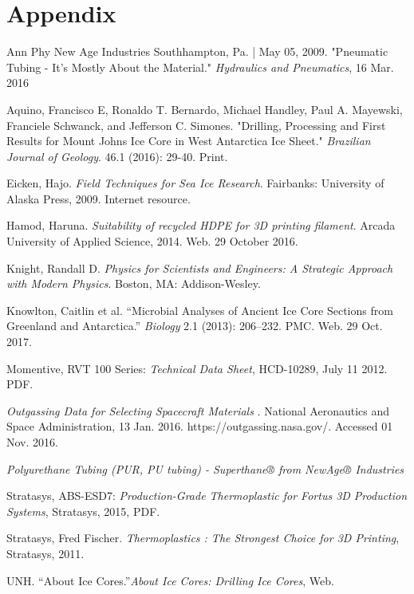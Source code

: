 \documentclass{article}
\begin{document}
\section{Appendix}
\begin{thebibliography}{12}
Ann Phy New Age Industries Southhampton, Pa. | May 05, 2009. "Pneumatic Tubing - It's Mostly About the Material." \textit{Hydraulics and Pneumatics}, 16 Mar. 2016

Aquino, Francisco E, Ronaldo T. Bernardo, Michael Handley, Paul A. Mayewski, Franciele Schwanck, and Jefferson C. Simones. "Drilling, Processing and First Results for Mount Johns Ice Core in West Antarctica Ice Sheet." \textit{Brazilian Journal of Geology}. 46.1 (2016): 29-40. Print.

Eicken, Hajo. \textit{Field Techniques for Sea Ice Research}. Fairbanks: University of Alaska Press, 2009. Internet resource.

Hamod, Haruna. \textit{Suitability of recycled HDPE for 3D printing filament}. Arcada University of Applied Science, 2014. Web. 29 October 2016.

Knight, Randall D. \textit{Physics for Scientists and Engineers: A Strategic Approach with Modern Physics}. Boston, MA: Addison-Wesley.

Knowlton, Caitlin et al. “Microbial Analyses of Ancient Ice Core Sections from Greenland and Antarctica.” \textit{Biology} 2.1 (2013): 206–232. PMC. Web. 29 Oct. 2017.

Momentive, RVT 100 Series: \textit{Technical Data Sheet}, HCD-10289, July 11 2012. PDF.

\textit{Outgassing Data for Selecting Spacecraft Materials} . National Aeronautics and Space Administration, 13 Jan. 2016. https://outgassing.nasa.gov/. Accessed 01 Nov. 2016.

\textit{Polyurethane Tubing (PUR, PU tubing) - Superthane® from NewAge® Industries}

Stratasys, ABS-ESD7: \textit{Production-Grade Thermoplastic for Fortus 3D Production Systems}, Stratasys, 2015, PDF.

Stratasys, Fred Fischer. \textit{Thermoplastics : The Strongest Choice for 3D Printing}, Stratasys, 2011.

UNH. “About Ice Cores.”\textit{About Ice Cores: Drilling Ice Cores}, Web.

\end{thebibliography}




\end{document}
